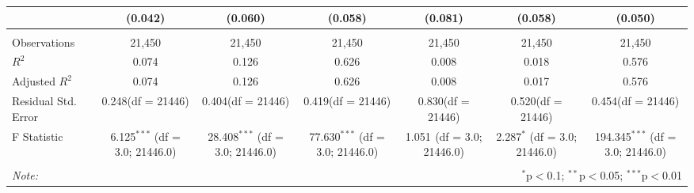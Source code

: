 \documentclass[12pt]{article}
\begin{document}
\begin{table}[!htbp]
\begin{tabular}{@{\extracolsep{5pt}}lcccccc}
  & (0.042) & (0.060) & (0.058) & (0.081) & (0.058) & (0.050) \\
\hline \\[-1.8ex]
 Observations & 21,450 & 21,450 & 21,450 & 21,450 & 21,450 & 21,450 \\
 $R^2$ & 0.074 & 0.126 & 0.626 & 0.008 & 0.018 & 0.576 \\
 Adjusted $R^2$ & 0.074 & 0.126 & 0.626 & 0.008 & 0.017 & 0.576 \\
 Residual Std. Error & 0.248(df = 21446) & 0.404(df = 21446) & 0.419(df = 21446) & 0.830(df = 21446) & 0.520(df = 21446) & 0.454(df = 21446)  \\
 F Statistic & 6.125$^{***}$ (df = 3.0; 21446.0) & 28.408$^{***}$ (df = 3.0; 21446.0) & 77.630$^{***}$ (df = 3.0; 21446.0) & 1.051$^{}$ (df = 3.0; 21446.0) & 2.287$^{*}$ (df = 3.0; 21446.0) & 194.345$^{***}$ (df = 3.0; 21446.0) \\
\hline
\hline \\[-1.8ex]
\textit{Note:} & \multicolumn{6}{r}{$^{*}$p$<$0.1; $^{**}$p$<$0.05; $^{***}$p$<$0.01} \\
\end{tabular}
\end{table}
\end{document}
